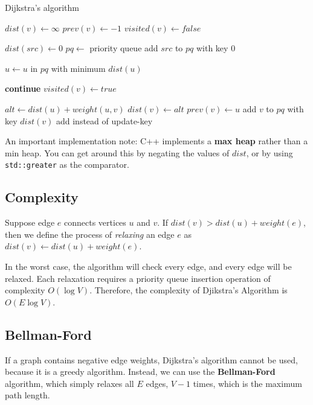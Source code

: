\begin{algorithm}[H]
\caption{Dijkstra's algorithm}
\begin{algorithmic}

    \State $dist(v) \gets \infty$
    \State $prev(v) \gets -1$
    \State $visited(v) \gets false$
\EndFor

\State $dist(src) \gets 0$
\State $pq \gets$ priority queue
\State add $src$ to $pq$ with key $0$

    \State $u \gets u$ in $pq$ with minimum $dist(u)$
    
        \State \textbf{continue}
    \EndIf
    \State $visited(v) \gets true$

        \State $alt \gets dist(u) + weight(u, v)$
            \State $dist(v) \gets alt$
            \State $prev(v) \gets u$
            \State add $v$ to $pq$ with key $dist(v)$
            \Comment add instead of update-key
        \EndIf
    \EndFor
\EndWhile

\end{algorithmic}
\end{algorithm}

An important implementation note: C++ implements a \textbf{max heap} rather than a min heap. You can get around this by negating the values of $dist$, or by using \verb|std::greater| as the comparator.


\subsection{Complexity}

Suppose edge $e$ connects vertices $u$ and $v$. If $dist(v) > dist(u) + weight(e)$, then we define the process of \textit{relaxing} an edge $e$ as $dist(v) \gets dist(u) + weight(e)$.

In the worst case, the algorithm will check every edge, and every edge will be relaxed. Each relaxation requires a priority queue insertion operation of complexity $O(\log V)$. Therefore, the complexity of Djikstra's Algorithm is $O(E \log V)$.

\subsection{Bellman-Ford}
If a graph contains negative edge weights, Dijkstra's algorithm cannot be used, because it is a greedy algorithm. Instead, we can use the \textbf{Bellman-Ford} algorithm, which simply relaxes all $E$ edges, $V-1$ times, which is the maximum path length.

